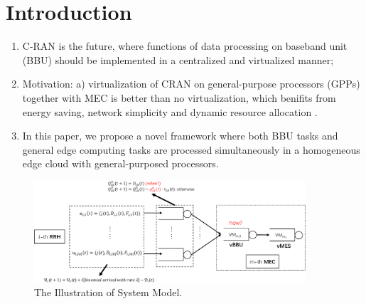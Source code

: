 \section{Introduction}
\label{sec:intro}

\begin{enumerate}
	\item C-RAN is the future, where functions of data processing on baseband unit (BBU) should be implemented in a centralized and virtualized manner;
	\item Motivation: a) virtualization of CRAN on general-purpose processors (GPPs) together with MEC is better than no virtualization, which benifits from energy saving, network simplicity and dynamic resource allocation \cite{cran-survey}.
	\item In this paper, we propose a novel framework where both BBU tasks and general edge computing tasks are processed simultaneously in a homogeneous edge cloud with general-purposed processors.
\end{enumerate}

\begin{figure}[htb!]
	\centering
	\includegraphics[width=0.9\textwidth]{images/cran-system-model.pdf}
	\caption{The Illustration of System Model.}
	\label{fig:system-model}
\end{figure}